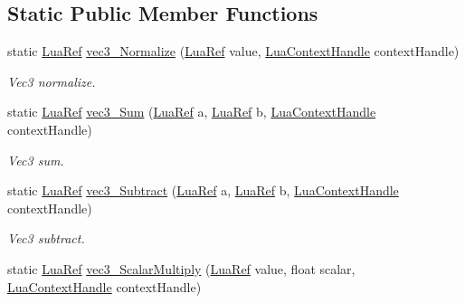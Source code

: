 \subsection*{Static Public Member Functions}
\begin{DoxyCompactItemize}
\item 
static \hyperlink{_lua_context_8h_a2220f03700ba40e366f0ee2d684d5c91}{Lua\+Ref} \hyperlink{class_lua_vector_utility_ad56035d71fe5c7ed373f998aa176faa0}{vec3\+\_\+\+Normalize} (\hyperlink{_lua_context_8h_a2220f03700ba40e366f0ee2d684d5c91}{Lua\+Ref} value, \hyperlink{_lua_context_8h_a2ffcc2d3ed21165072a1d7b61259bf14}{Lua\+Context\+Handle} context\+Handle)
\begin{DoxyCompactList}\small\item\em Vec3 normalize. \end{DoxyCompactList}\item 
static \hyperlink{_lua_context_8h_a2220f03700ba40e366f0ee2d684d5c91}{Lua\+Ref} \hyperlink{class_lua_vector_utility_aaa2a96f3165c794d050ec530681dedd0}{vec3\+\_\+\+Sum} (\hyperlink{_lua_context_8h_a2220f03700ba40e366f0ee2d684d5c91}{Lua\+Ref} a, \hyperlink{_lua_context_8h_a2220f03700ba40e366f0ee2d684d5c91}{Lua\+Ref} b, \hyperlink{_lua_context_8h_a2ffcc2d3ed21165072a1d7b61259bf14}{Lua\+Context\+Handle} context\+Handle)
\begin{DoxyCompactList}\small\item\em Vec3 sum. \end{DoxyCompactList}\item 
static \hyperlink{_lua_context_8h_a2220f03700ba40e366f0ee2d684d5c91}{Lua\+Ref} \hyperlink{class_lua_vector_utility_ad2caa5ad229b47ee90c54ea003aeeac2}{vec3\+\_\+\+Subtract} (\hyperlink{_lua_context_8h_a2220f03700ba40e366f0ee2d684d5c91}{Lua\+Ref} a, \hyperlink{_lua_context_8h_a2220f03700ba40e366f0ee2d684d5c91}{Lua\+Ref} b, \hyperlink{_lua_context_8h_a2ffcc2d3ed21165072a1d7b61259bf14}{Lua\+Context\+Handle} context\+Handle)
\begin{DoxyCompactList}\small\item\em Vec3 subtract. \end{DoxyCompactList}\item 
static \hyperlink{_lua_context_8h_a2220f03700ba40e366f0ee2d684d5c91}{Lua\+Ref} \hyperlink{class_lua_vector_utility_a5d267e8cff5915434bfa00f8ff2bf687}{vec3\+\_\+\+Scalar\+Multiply} (\hyperlink{_lua_context_8h_a2220f03700ba40e366f0ee2d684d5c91}{Lua\+Ref} value, float scalar, \hyperlink{_lua_context_8h_a2ffcc2d3ed21165072a1d7b61259bf14}{Lua\+Context\+Handle} context\+Handle)

\end{DoxyCompactItemize}
